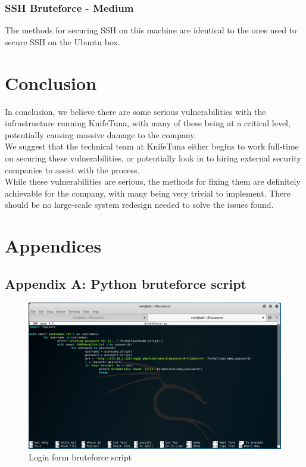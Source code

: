 \documentclass{report}
\begin{document}
\subsection{SSH Bruteforce - Medium}
The methods for securing SSH on this machine are identical to the ones used to secure SSH on the Ubuntu box.


\chapter{Conclusion}
In conclusion, we believe there are some serious vulnerabilities with the infrastructure running KnifeTuna, with many of these being at a critical level, potentially causing massive damage to the company.\\
We suggest that the technical team at KnifeTuna either begins to work full-time on securing these vulnerabilities, or potentially look in to hiring external security companies to assist with the process.\\
While these vulnerabilities are serious, the methods for fixing them are definitely achievable for the company, with many being very trivial to implement. There should be no large-scale system redesign needed to solve the issues found.\\



\chapter{Appendices}
\section{Appendix A: Python bruteforce script}
\begin{figure}[!htb]
	\centering
	\includegraphics[scale=0.4]{img/bruteforcescript.png}
	\caption{Login form bruteforce script}
\end{figure}
\end{document}
